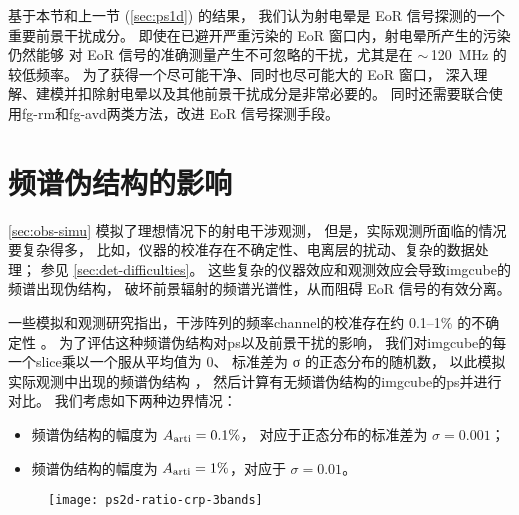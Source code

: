 基于本节和上一节 (\autoref{sec:ps1d}) 的结果，
我们认为射电晕是 EoR 信号探测的一个重要前景干扰成分。
即使在已避开严重污染的 EoR 窗口内，射电晕所产生的污染仍然能够
对 EoR 信号的准确测量产生不可忽略的干扰，尤其是在 $\sim$\,\SI{120}{\MHz} 的较低频率。
为了获得一个尽可能干净、同时也尽可能大的 EoR 窗口，
深入理解、建模并扣除射电晕以及其他前景干扰成分是非常必要的。
同时还需要联合使用\ac{fg-rm}和\ac{fg-avd}两类方法，改进 EoR 信号探测手段。


\section{频谱伪结构的影响}
\label{sec:freq-artifacts}

\autoref{sec:obs-simu} 模拟了理想情况下的射电干涉观测，
但是，实际观测所面临的情况要复杂得多，
比如，仪器的校准存在不确定性、电离层的扰动、复杂的数据处理；
参见 \autoref{sec:det-difficulties}。
这些复杂的仪器效应和观测效应会导致\ac{imgcube}的频谱出现伪结构，
破坏前景辐射的频谱光谱性，从而阻碍 EoR 信号的有效分离。

一些模拟和观测研究指出，干涉阵列的频率\ac{channel}的校准存在约
\numrange{0.1}{1}\% 的不确定性
\cite{barry2016,beardsley2016,ewallWice2017}。
为了评估这种频谱伪结构对\ac{ps}以及前景干扰的影响，
我们对\ac{imgcube}的每一个\ac{slice}乘以一个服从平均值为 0、
标准差为 σ 的正态分布的随机数，
以此模拟实际观测中出现的频谱伪结构 \cite{chapman2016}，
然后计算有无频谱伪结构的\ac{imgcube}的\ac{ps}并进行对比。
我们考虑如下两种边界情况：
\begin{itemize}
  \item 频谱伪结构的幅度为 $A_{\mathrm{arti}} = 0.1\%$，
    对应于正态分布的标准差为 $σ = 0.001$；
  \item 频谱伪结构的幅度为 $A_{\mathrm{arti}} = 1\%$，对应于 $σ = 0.01$。
\end{itemize}

\begin{figure}[htp]
  \centering
  \texttt{[image: ps2d-ratio-crp-3bands]}
  \label{fig:ps2d-ratio-crp}
\end{figure}

